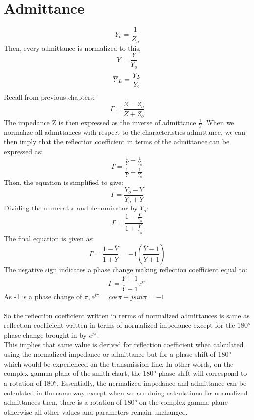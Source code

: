 \section{Admittance}
\begin{equation}
Y_o= \frac{1}{Z_o}
\end{equation}
Then, every admittance is normalized to this,
\begin{equation*}
\overline{Y} = \frac{Y}{Y_o} 
\end{equation*}
\begin{equation*}
\space  \overline{Y}_L = \frac{Y_L}{Y_o}
\end{equation*}
Recall from previous chapters:
\begin{equation*}
\Gamma = \frac{Z-Z_o}{Z+Z_o} 
\end{equation*}
The impedance Z is then expressed as the inverse of admittance $\frac{1}{Y}$. When we normalize all admittances with respect to the characteristics admittance, we can then imply that the reflection coefficient in terms of the admittance can be expressed as:
\begin{equation*}
\Gamma = \frac{\frac{1}{Y} - \frac{1}{Y_o}}{\frac{1}{Y} + \frac{1}{Y_o}}
\end{equation*}
Then, the equation is simplified to give:
\begin{equation}
\Gamma= \frac{Y_o - Y}{Y_o + Y} 
\end{equation}
Dividing the numerator and denominator by $Y_o$:
\begin{equation*}
\Gamma= \frac{1 - \frac{Y}{Y_o}}{1 + \frac{Y}{Y_o}}
\end{equation*}
The final equation is given as:
\begin{equation*}
\Gamma= \frac{1 - \overline{Y}}{1 + \overline{Y}} = -1 (\frac{\overline{Y} - 1}{\overline{Y} + 1}) 
\end{equation*}
The negative sign indicates a phase change making reflection coefficient equal to:
\begin{equation}
\Gamma = \frac{\overline{Y} - 1}{\overline{Y} + 1}e^{j\pi}
\end{equation}
As -1 is a phase change of $\pi, e^{j\pi} = cos\pi + jsin\pi = -1$\\\\
So the reflection coefficient written in terms of normalized admittances is same as reflection coefficient written in terms of normalized impedance except for the 180$^o$ phase change brought in by $e^{j\pi}$.\\
This implies that same value is derived for reflection coefficient when calculated using the normalized impedance or admittance but for a phase shift of 180$^o$ which would be experienced on the transmission line. In other words, on the complex gamma plane of the smith chart, the 180$^o$ phase shift will correspond to a rotation of 180$^o$. Essentially, the normalized impedance and admittance can be calculated in the same way except when we are doing calculations for normalized admittances then, there is a rotation of 180$^o$ on the complex gamma plane otherwise all other values and parameters remain unchanged.
